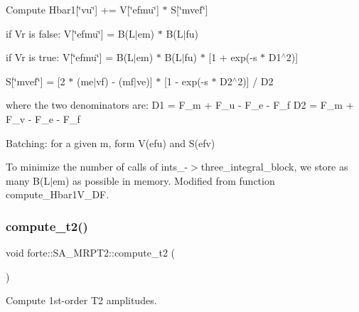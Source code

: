 Compute Hbar1\mbox{[}\char`\"{}vu\char`\"{}\mbox{]} += V\mbox{[}\char`\"{}efmu\char`\"{}\mbox{]} $\ast$ S\mbox{[}\char`\"{}mvef\char`\"{}\mbox{]}


\begin{DoxyItemize}
\item if Vr is false\+: V\mbox{[}\char`\"{}efmu\char`\"{}\mbox{]} = B(L$\vert$em) $\ast$ B(L$\vert$fu)
\item if Vr is true\+: V\mbox{[}\char`\"{}efmu\char`\"{}\mbox{]} = B(L$\vert$em) $\ast$ B(L$\vert$fu) $\ast$ \mbox{[}1 + exp(-\/s $\ast$ D1$^\wedge$2)\mbox{]}
\item S\mbox{[}\char`\"{}mvef\char`\"{}\mbox{]} = \mbox{[}2 $\ast$ (me$\vert$vf) -\/ (mf$\vert$ve)\mbox{]} $\ast$ \mbox{[}1 -\/ exp(-\/s $\ast$ D2$^\wedge$2)\mbox{]} / D2
\end{DoxyItemize}

where the two denominators are\+: D1 = F\+\_\+m + F\+\_\+u -\/ F\+\_\+e -\/ F\+\_\+f D2 = F\+\_\+m + F\+\_\+v -\/ F\+\_\+e -\/ F\+\_\+f

Batching\+: for a given m, form V(efu) and S(efv)

To minimize the number of calls of ints\+\_\+-\/$>$three\+\_\+integral\+\_\+block, we store as many B(L$\vert$em) as possible in memory. Modified from function compute\+\_\+\+Hbar1\+V\+\_\+\+DF.\mbox{\label{classforte_1_1_s_a___m_r_p_t2_a483a994948cb525c0d524a16599df962}} 
\subsubsection{\texorpdfstring{compute\+\_\+t2()}{compute\_t2()}}
{\footnotesize\ttfamily void forte\+::\+S\+A\+\_\+\+M\+R\+P\+T2\+::compute\+\_\+t2 (\begin{DoxyParamCaption}{ }\end{DoxyParamCaption})\hspace{0.3cm}{\ttfamily [protected]}}



Compute 1st-\/order T2 amplitudes. 

\mbox{\label{classforte_1_1_s_a___m_r_p_t2_ab325a9658616f40f8f8326a9ed4cd18d}} 
